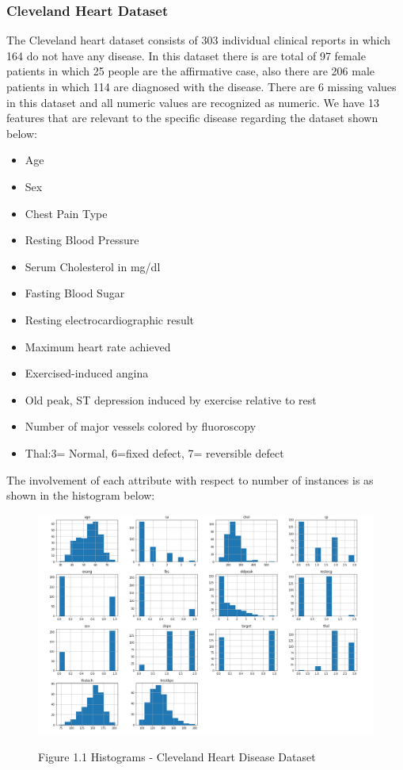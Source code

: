 \documentclass[oneside,12pt]{Classes/VTU}
\begin{document}
    \subsubsection{Cleveland Heart Dataset}
    The Cleveland heart dataset consists of 303 individual clinical reports in which 164 do not have any disease. In this dataset there is are total of 97 female patients in which 25 people are the affirmative case, also there are 206 male patients in which 114 are diagnosed with the disease. There are 6 missing values in this dataset and all numeric values are recognized as numeric.
    We have 13 features that are relevant to the specific disease regarding the dataset shown below:
    \begin{itemize}
    	\item Age
    	\item Sex
    	\item Chest Pain Type
    	\item Resting Blood Pressure 
    	\item Serum Cholesterol in mg/dl 
    	\item Fasting Blood Sugar
    	\item Resting electrocardiographic result
    	\item Maximum heart rate achieved 
    	\item Exercised-induced angina
    	\item Old peak, ST depression induced by exercise relative to rest 
    	\item Number of major vessels colored by fluoroscopy 
    	\item Thal:3= Normal, 6=fixed defect, 7= reversible defect
    \end{itemize}
    The involvement of each attribute with respect to number of instances is as shown in the histogram below:
    
    \begin{figure}
    			\begin{center}
    				\includegraphics[scale=0.4]{images/hearthistogram.png}
    			\end{center}
	    		\begin{center}
	    			Figure 1.1 Histograms - Cleveland Heart Disease Dataset
	    		\end{center}
    \end{figure}
	
\end{document}
